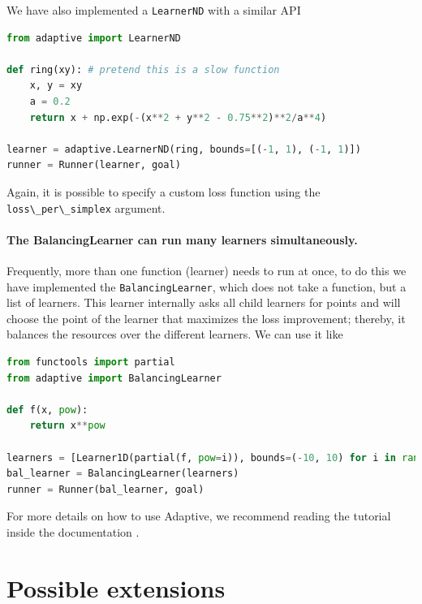 \documentclass[english, twocolumn, 10pt, aps, superscriptaddress, floatfix, prb, citeautoscript]{revtex4-1}
\renewcommand{\citep}{\cite}
\newcommand{\passthrough}[1]{\lstset{mathescape=false}#1\lstset{mathescape=true}}
\begin{document}
We have also implemented a \passthrough{\lstinline!LearnerND!} with a similar API

\begin{lstlisting}[language=Python]
from adaptive import LearnerND

def ring(xy): # pretend this is a slow function
    x, y = xy
    a = 0.2
    return x + np.exp(-(x**2 + y**2 - 0.75**2)**2/a**4)

learner = adaptive.LearnerND(ring, bounds=[(-1, 1), (-1, 1)])
runner = Runner(learner, goal)
\end{lstlisting}

Again, it is possible to specify a custom loss function using the \passthrough{\lstinline!loss\_per\_simplex!} argument.

\hypertarget{the-balancinglearner-can-run-many-learners-simultaneously.}{%
\paragraph{The BalancingLearner can run many learners simultaneously.}\label{the-balancinglearner-can-run-many-learners-simultaneously.}}

Frequently, more than one function (learner) needs to run at once, to do this we have implemented the \passthrough{\lstinline!BalancingLearner!}, which does not take a function, but a list of learners.
This learner internally asks all child learners for points and will choose the point of the learner that maximizes the loss improvement; thereby, it balances the resources over the different learners.
We can use it like

\begin{lstlisting}[language=Python]
from functools import partial
from adaptive import BalancingLearner

def f(x, pow):
    return x**pow

learners = [Learner1D(partial(f, pow=i)), bounds=(-10, 10) for i in range(2, 10)]
bal_learner = BalancingLearner(learners)
runner = Runner(bal_learner, goal)
\end{lstlisting}

For more details on how to use Adaptive, we recommend reading the tutorial inside the documentation \citep{Nijholt2018}.

\hypertarget{possible-extensions}{%
\section{Possible extensions}\label{possible-extensions}}
\end{document}
